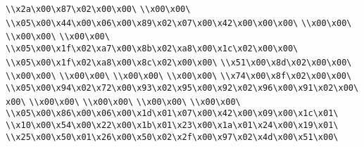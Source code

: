 \verb|\\x2a\x00\x87\x02\x00\x00\|\newline
\verb|\\x00\x00\|\newline
\verb|\\x05\x00\x44\x00\x06\x00\x89\x02\x07\x00\x42\x00\x00\x00\|\newline
\verb|\\x00\x00\|\newline
\verb|\\x00\x00\|\newline
\verb|\\x00\x00\|\newline
\verb|\\x05\x00\x1f\x02\xa7\x00\x8b\x02\xa8\x00\x1c\x02\x00\x00\|\newline
\verb|\\x05\x00\x1f\x02\xa8\x00\x8c\x02\x00\x00\|\newline
\verb|\\x51\x00\x8d\x02\x00\x00\|\newline
\verb|\\x00\x00\|\newline
\verb|\\x00\x00\|\newline
\verb|\\x00\x00\|\newline
\verb|\\x00\x00\|\newline
\verb|\\x74\x00\x8f\x02\x00\x00\|\newline
\verb|\\x05\x00\x94\x02\x72\x00\x93\x02\x95\x00\x92\x02\x96\x00\x91\x02\x00\x00\|\newline
\verb|\\x00\x00\|\newline
\verb|\\x00\x00\|\newline
\verb|\\x00\x00\|\newline
\verb|\\x00\x00\|\newline
\verb|\\x05\x00\x86\x00\x06\x00\x1d\x01\x07\x00\x42\x00\x09\x00\x1c\x01\|\newline
\verb|\\x10\x00\x54\x00\x22\x00\x1b\x01\x23\x00\x1a\x01\x24\x00\x19\x01\|\newline
\verb|\\x25\x00\x50\x01\x26\x00\x50\x02\x2f\x00\x97\x02\x4d\x00\x51\x00\|\newline
